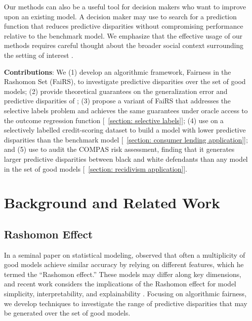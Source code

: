 \documentclass{article}
\begin{document}
Our methods can also be a useful tool for decision makers who want to improve upon an existing model. A decision maker may use \fairs to search for a prediction function that reduces predictive disparities without compromising performance relative to the benchmark model.
We emphasize that the effective usage of our methods requires careful thought about the broader social context surrounding the setting of interest \cite{SelbstEtAl(19), HolsteinEtAl(19)}.

\textbf{Contributions}: We (1) develop an algorithmic framework, Fairness in the Rashomon Set (FaiRS), to investigate predictive disparities over the set of good models; (2) provide theoretical guarantees on the generalization error and predictive disparities of \fairs [\textsection~\ref{section: reductions approach}]; (3) propose a variant of FaiRS that addresses the selective labels problem and achieves the same guarantees under oracle access to the outcome regression function [\textsection~\ref{section: selective labels}]; (4) use \fairs on a selectively labelled credit-scoring dataset to build a model with lower predictive disparities than the benchmark model [\textsection~\ref{section: consumer lending application}]; and (5) use \fairs to audit the COMPAS risk assessment, finding that it generates larger predictive disparities between black and white defendants than any model in the set of good models [\textsection~\ref{section: recidivism application}]. %

\section{Background and Related Work} \label{sec:lit}

\subsection{Rashomon Effect}
In a seminal paper on statistical modeling, \cite{Breiman(01)} observed that often a multiplicity of good models achieve similar accuracy by relying on different features, which he termed the ``Rashomon effect.” 
These models  may differ along key dimensions, and recent work considers the implications of the Rashomon effect for model simplicity, interpretability, and explainability
\cite{Rudin(19), FisherEtAl(19), MarxEtAl(19), DongRudin(20), SemenovaEtAl(20)}. 
Focusing on algorithmic fairness, 
we develop techniques to investigate the range of predictive disparities that may be generated over the set of good models. %
\end{document}
